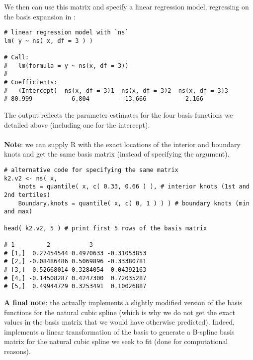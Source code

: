 \documentclass{article}
\begin{document}
\noindent We then can use this matrix and specify a linear regression model, regressing  {} on the basis expansion in  {}:

 \vspace{0.5cm}
 
\begin{lstlisting}
# linear regression model with `ns`
lm( y ~ ns( x, df = 3 ) )

# Call:
#   lm(formula = y ~ ns(x, df = 3))
# 
# Coefficients:
#   (Intercept)  ns(x, df = 3)1  ns(x, df = 3)2  ns(x, df = 3)3  
# 80.999           6.804         -13.666          -2.166  

\end{lstlisting}

 \vspace{0.5cm}
\noindent The output reflects the parameter estimates for the four basis functions we detailed above (including one for the intercept).\\
\\
\noindent \textbf{Note}: we can supply R with the exact locations of the interior and boundary knots and get the same basis matrix (instead of specifying the  {} argument).

\vspace{0.5cm}
 
\begin{lstlisting}
# alternative code for specifying the same matrix
k2.v2 <- ns( x, 
    knots = quantile( x, c( 0.33, 0.66 ) ), # interior knots (1st and 2nd tertiles)
    Boundary.knots = quantile( x, c( 0, 1 ) ) ) # boundary knots (min and max)

head( k2.v2, 5 ) # print first 5 rows of the basis matrix

# 1         2           3
# [1,]  0.27454544 0.4970633 -0.31053853
# [2,] -0.08486486 0.5069896 -0.33380781
# [3,]  0.52668014 0.3284054  0.04392163
# [4,] -0.14508287 0.4247300  0.72035287
# [5,]  0.49944729 0.3253491  0.10026887
\end{lstlisting}

\noindent \textbf{A final note}: the {} actually implements a slightly modified version of the basis functions for the natural cubic spline (which is why we do not get the exact values in the basis matrix that we would have otherwise predicted). Indeed, {} implements a linear transformation of the basis to generate a B-spline basis matrix for the natural cubic spline we seek to fit (done for computational reasons).

\printbibliography[title={References}]
\end{document}
